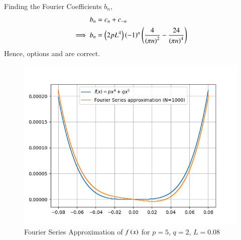 \documentclass[journal,12pt,twocolumn]{IEEEtran}
\theoremstyle{remark}
\begin{document}
Finding the Fourier Coefficients $b_n$,
\begin{align}
    b_n&=c_n+c_{-n}\\
    \implies b_n&=\left(2pL^4\right)\left(-1\right)^n\left(\frac{4}{\left(\pi n\right)^2}-\frac{24}{\left(\pi n\right)^4}\right)
\end{align}
Hence, options  and  are correct.
\begin{figure}[h!]
    \centering
    \includegraphics[width=\linewidth]{figs/Figure_1.png}
    \caption{Fourier Series Approximation of $f\left(x\right)$ for $p=5$, $q=2$, $L=0.08$}
\end{figure}
\end{document}
